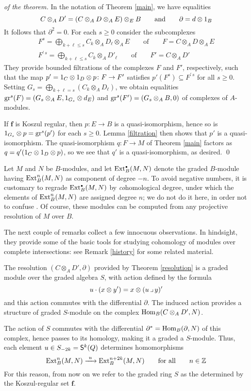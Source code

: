 \begin{proof}[of the theorem]
In the notation of Theorem \ref{main}, we have equalities
\[
C \otimes_A D'=(C\otimes_A D \otimes_A E)\otimes_E B
\qquad\text{and}\qquad
\partial= d\otimes 1_B 
\]
It follows that $\partial^2=0$.  For each $s\ge0$ consider the
subcomplexes
\begin{gather*}
F^s = \bigoplus_{k+\ell \le s} C_k \otimes_A D_\ell \otimes_A E
\qquad\text{of}\qquad F=C \otimes_A D \otimes_A E\\
F^{\prime\,s} = \bigoplus_{k+\ell \le s} C_k \otimes_A D'_\ell
\qquad\text{of}\qquad F'=C \otimes_A D'
\end{gather*}
They provide bounded filtrations of the complexes $F$ and $F'$,
respectively, such that the map $p'=1_C\otimes 1_D\otimes p\colon F\to F'$ 
satisfies $p'(F^s)\subseteq F^{\prime\,s}$ for all $s\ge0$.
Setting $G_s=\bigoplus_{k+\ell=s}(C_k \otimes_A D_\ell)$, we obtain
equalities ${\operatorname{gr}}^s(F)=(G_s\otimes_AE,1_{G_s}\otimes d_E)$ and ${\operatorname{gr}}^s(F')=
(G_s\otimes_AB,0)$ of complexes of $A$-modules.

If $\boldsymbol f$ is Koszul regular, then $p\colon E\to B$ is a
quasi-isomorphism, hence so is $1_{G_s}\otimes p={\operatorname{gr}}^s(p')$ for each
$s\ge0$.  Lemma \ref{filtration} then shows that $p'$ is a
quasi-isomorphism.  The quasi-isomorphism $q\colon F\to M$ of Theorem
\ref{main} factors as $q=q'(1_C\otimes 1_D\otimes p)$, so we see that $q'$ is
a quasi-isomorphism, as desired.
 \qed\end{proof}

Let $M$ and $N$ be $B$-modules, and let $\operatorname{Ext}^{\scriptscriptstyle\bullet}_B(M,N)$ denote the
graded $B$-module having $\operatorname{Ext}^n_B(M,N)$ as component of degree $-n$.
To avoid negative numbers, it is customary to regrade $\operatorname{Ext}^{\scriptscriptstyle\bullet}_B(M,N)$
by {\it co\/}homological degree, under which the elements of
$\operatorname{Ext}^n_B(M,N)$ are assigned degree $n$; we do not do it here, in order
not to confuse \Mtwo. Of course, these modules can be computed from any
projective resolution of $M$ over $B$.

The next couple of remarks collect a few innocuous observations.  In
hindsight, they provide some of the basic tools for studying cohomology
of modules over complete intersections: see Remark \ref{history} for
some related material.

\begin{Remark}
\label{action}
The resolution $(C\otimes_A D',\partial)$ provided by Theorem
\ref{resolution} is a graded module over the graded algebra $S$, with
action defined by the formula
\[
u\cdot(x\otimes y')= x\otimes (u\operatorname{\lrcorner} y)'
\]
and this action commutes with the differential $\partial$.  The induced
action provides a structure of graded $S$-module on the complex
$\operatorname{Hom}_B(C\otimes_A D',N)$.

The action of $S$ commutes with the differential $\partial^*=
\operatorname{Hom}_B(\partial,N)$ of this complex, hence passes to its homology,
making it a graded a $S$-module.  Thus, each element $u\in
S_{-2k}={\mathsf S}^k(Q)$ determines homomorphisms
\[
\Ext^n_B(M,N)\xrightarrow{\ u\ }\Ext^{n+2k}_B(M,N)
\qquad\text{for all}\qquad n\in\Z
\]
For this reason, from now on we refer to the graded ring $S$ as the
{\it{}\/} determined by the
Koszul-regular set $\boldsymbol f$.
 \end{Remark}

